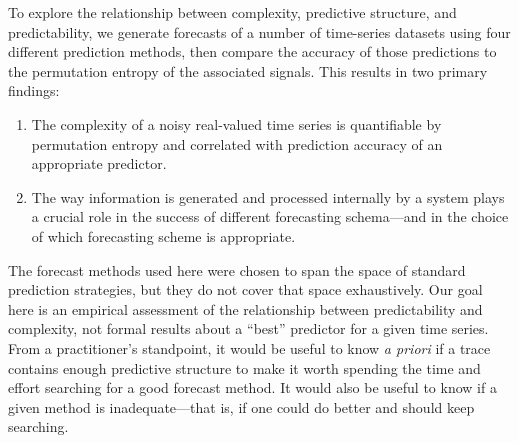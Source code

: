 To explore the relationship between complexity, predictive structure,
and predictability, we generate forecasts of a number of time-series
datasets using four different prediction methods, then compare the
accuracy of those predictions to the permutation entropy of the
associated signals.  This results in two primary findings:
\begin{enumerate}
\item The complexity of a noisy real-valued time series is
  quantifiable by permutation entropy and correlated with prediction
  accuracy of an appropriate predictor.
\item The way information is generated and processed internally by a
  system plays a crucial role in the success of different forecasting
  schema---and in the choice of which forecasting scheme is appropriate.
\end{enumerate}
The forecast methods used here were chosen to span the space of
standard prediction strategies, but they do not cover that space
exhaustively.  Our goal here is an empirical assessment of the
relationship between predictability and complexity, not formal results
about a ``best'' predictor for a given time series.  From a
practitioner's standpoint, it would be useful to know {\sl a priori}
if a trace contains enough predictive structure to make it worth
spending the time and effort searching for a good forecast method.  It
would also be useful to know if a given method is inadequate---that
is, if one could do better and should keep searching.


